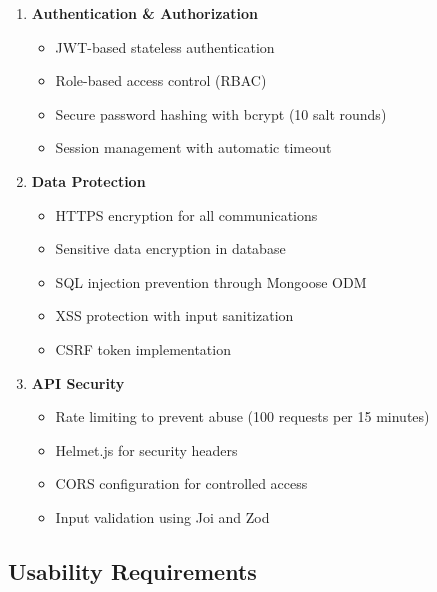 \begin{enumerate}[leftmargin=*]
    \item \textbf{Authentication \& Authorization}
    \begin{itemize}
        \item JWT-based stateless authentication
        \item Role-based access control (RBAC)
        \item Secure password hashing with bcrypt (10 salt rounds)
        \item Session management with automatic timeout
    \end{itemize}
    
    \item \textbf{Data Protection}
    \begin{itemize}
        \item HTTPS encryption for all communications
        \item Sensitive data encryption in database
        \item SQL injection prevention through Mongoose ODM
        \item XSS protection with input sanitization
        \item CSRF token implementation
    \end{itemize}
    
    \item \textbf{API Security}
    \begin{itemize}
        \item Rate limiting to prevent abuse (100 requests per 15 minutes)
        \item Helmet.js for security headers
        \item CORS configuration for controlled access
        \item Input validation using Joi and Zod
    \end{itemize}
\end{enumerate}

\subsection{Usability Requirements}

